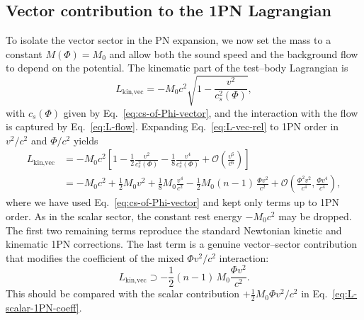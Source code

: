 \documentclass[11pt]{article}
\begin{document}
\subsection{Vector contribution to the 1PN Lagrangian}
\label{subsec:vector-Lagrangian}

To isolate the vector sector in the PN expansion, we now set the mass to a
constant \(M(\Phi) = M_0\) and allow both the sound speed and the background
flow to depend on the potential.  The kinematic part of the test--body
Lagrangian is
\begin{equation}
  L_{\text{kin,vec}}
  = -M_0 c^2 \sqrt{1 - \frac{v^2}{c_s^2(\Phi)}},
  \label{eq:L-vec-rel}
\end{equation}
with \(c_s(\Phi)\) given by Eq.~\eqref{eq:cs-of-Phi-vector}, and the
interaction with the flow is captured by Eq.~\eqref{eq:L-flow}.  Expanding
Eq.~\eqref{eq:L-vec-rel} to 1PN order in \(v^2/c^2\) and \(\Phi/c^2\) yields
\begin{align}
  L_{\text{kin,vec}}
  &= -M_0 c^2 \left[ 1
    - \frac{1}{2}\frac{v^2}{c_s^2(\Phi)}
    - \frac{1}{8}\frac{v^4}{c_s^4(\Phi)}
    + \mathcal{O}\!\left( \frac{v^6}{c^6} \right) \right] \nonumber \\
  &= -M_0 c^2
    + \frac{1}{2} M_0 v^2
    + \frac{1}{8} M_0 \frac{v^4}{c^2}
    - \frac{1}{2} M_0 (n-1)\,\frac{\Phi v^2}{c^2}
    + \mathcal{O}\!\left( \frac{\Phi^2 v^2}{c^4},
                          \frac{\Phi v^4}{c^4} \right),
  \label{eq:L-kin-vec-expanded}
\end{align}
where we have used Eq.~\eqref{eq:cs-of-Phi-vector} and kept only terms up to
1PN order.  As in the scalar sector, the constant rest energy \(-M_0 c^2\)
may be dropped.  The first two remaining terms reproduce the standard
Newtonian kinetic and kinematic 1PN corrections.  The last term is a genuine
vector--sector contribution that modifies the coefficient of the mixed
\(\Phi v^2/c^2\) interaction:
\begin{equation}
  L_{\text{kin,vec}} \supset
  -\frac{1}{2} (n-1)\,M_0 \frac{\Phi v^2}{c^2}.
  \label{eq:L-vec-1PN-coeff}
\end{equation}
This should be compared with the scalar contribution
\(+\tfrac{1}{2} M_0 \Phi v^2/c^2\) in Eq.~\eqref{eq:L-scalar-1PN-coeff}.
\end{document}
